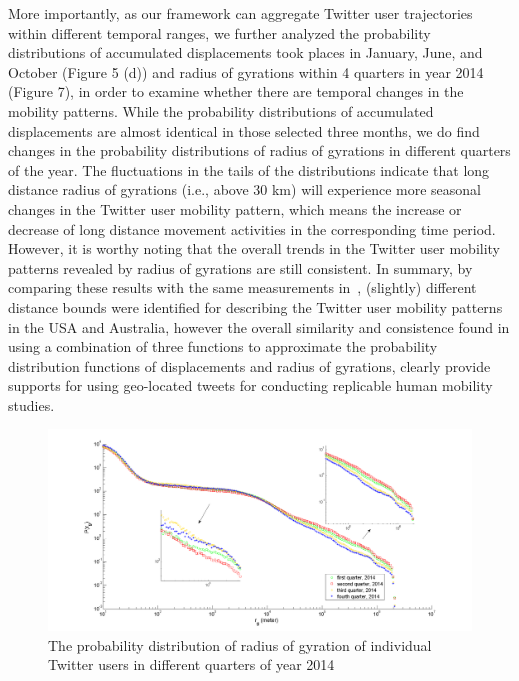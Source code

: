 \documentclass[ijgi,article,submit,moreauthors,pdftex,10pt,a4paper]{mdpi}
\theoremstyle{mdpi}
\newcounter{ex}
\newcounter{re}
\theoremstyle{mdpidefinition}
\begin{document}
More importantly, as our framework can aggregate Twitter user trajectories within different temporal ranges, we further analyzed the probability distributions of accumulated displacements took places in January, June, and October (Figure 5 (d)) and radius of gyrations within 4 quarters in year 2014 (Figure 7), in order to examine whether there are temporal changes in the mobility patterns. While the probability distributions of accumulated displacements are almost identical in those selected three months,  we do find changes in the probability distributions of radius of gyrations in different quarters of the year. 
The fluctuations in the tails of the distributions indicate that long distance radius of gyrations (i.e., above 30 km) will experience more seasonal changes in the Twitter user mobility pattern, which means the increase or decrease of long distance movement activities in the corresponding time period. 
However, it is worthy noting that the overall trends in the Twitter user mobility patterns revealed by radius of gyrations are still consistent.  In summary, by comparing these results with the same measurements in~\cite{Jurdak2015}, (slightly) different distance bounds were identified for describing the Twitter user mobility patterns in the USA and Australia, however the overall similarity and consistence found in using a combination of three functions to approximate the probability distribution functions of displacements and radius of gyrations, clearly provide supports for using geo-located tweets for conducting replicable human mobility studies.       
 
\begin{figure}[ht]
\centering
\includegraphics[width=1.0\linewidth]{./figures/gyration_season}
\caption{The probability distribution of radius of gyration of individual Twitter users in different quarters of year 2014}
\label{fig:Arch}
\end{figure}
\FloatBarrier
\end{document}
